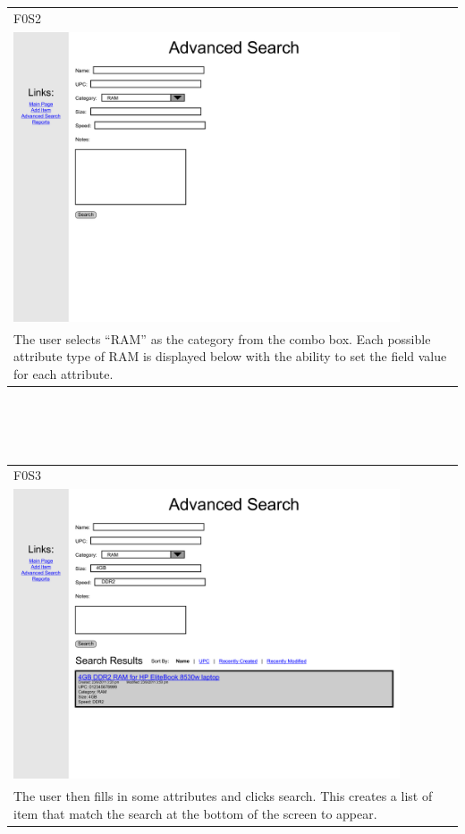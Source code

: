 \documentclass{article}
\begin{document}
~\\
~\\
\begin{tabular}{ p{4.5in} }
F0S2\\
\includegraphics[keepaspectratio, width=4.5in]{advancedSearchF0S2.pdf} \\
The user selects ``RAM'' as the category from the combo box. Each possible attribute type of RAM is displayed below with the ability to set the field value for each attribute.
\end{tabular}\\
~\\
~\\
\begin{tabular}{ p{4.5in} }
F0S3\\
\includegraphics[keepaspectratio, width=4.5in]{advancedSearchF0S3.pdf} \\
The user then fills in some attributes and clicks search.  This creates a list of item that match the search at the bottom of the screen to appear.
\end{tabular}\\
\end{document}

